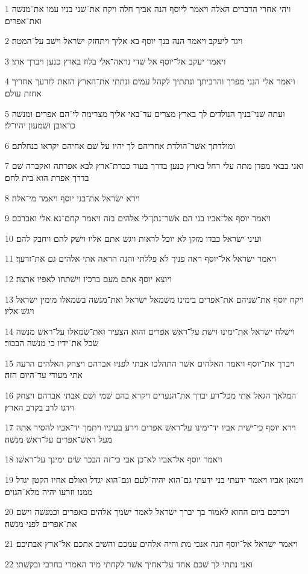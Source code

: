 \par 1 ויהי אחרי הדברים האלה ויאמר ליוסף הנה אביך חלה ויקח את־שׁני בניו עמו את־מנשׁה ואת־אפרים׃
\par 2 ויגד ליעקב ויאמר הנה בנך יוסף בא אליך ויתחזק ישׂראל וישׁב על־המטה׃
\par 3 ויאמר יעקב אל־יוסף אל שׁדי נראה־אלי בלוז בארץ כנען ויברך אתי׃
\par 4 ויאמר אלי הנני מפרך והרביתך ונתתיך לקהל עמים ונתתי את־הארץ הזאת לזרעך אחריך אחזת עולם׃
\par 5 ועתה שׁני־בניך הנולדים לך בארץ מצרים עד־באי אליך מצרימה לי־הם אפרים ומנשׁה כראובן ושׁמעון יהיו־לי׃
\par 6 ומולדתך אשׁר־הולדת אחריהם לך יהיו על שׁם אחיהם יקראו בנחלתם׃
\par 7 ואני בבאי מפדן מתה עלי רחל בארץ כנען בדרך בעוד כברת־ארץ לבא אפרתה ואקברה שׁם בדרך אפרת הוא בית לחם׃
\par 8 וירא ישׂראל את־בני יוסף ויאמר מי־אלה׃
\par 9 ויאמר יוסף אל־אביו בני הם אשׁר־נתן־לי אלהים בזה ויאמר קחם־נא אלי ואברכם׃
\par 10 ועיני ישׂראל כבדו מזקן לא יוכל לראות ויגשׁ אתם אליו וישׁק להם ויחבק להם׃
\par 11 ויאמר ישׂראל אל־יוסף ראה פניך לא פללתי והנה הראה אתי אלהים גם את־זרעך׃
\par 12 ויוצא יוסף אתם מעם ברכיו וישׁתחו לאפיו ארצה׃
\par 13 ויקח יוסף את־שׁניהם את־אפרים בימינו משׂמאל ישׂראל ואת־מנשׁה בשׂמאלו מימין ישׂראל ויגשׁ אליו׃
\par 14 וישׁלח ישׂראל את־ימינו וישׁת על־ראשׁ אפרים והוא הצעיר ואת־שׂמאלו על־ראשׁ מנשׁה שׂכל את־ידיו כי מנשׁה הבכור׃
\par 15 ויברך את־יוסף ויאמר האלהים אשׁר התהלכו אבתי לפניו אברהם ויצחק האלהים הרעה אתי מעודי עד־היום הזה׃
\par 16 המלאך הגאל אתי מכל־רע יברך את־הנערים ויקרא בהם שׁמי ושׁם אבתי אברהם ויצחק וידגו לרב בקרב הארץ׃
\par 17 וירא יוסף כי־ישׁית אביו יד־ימינו על־ראשׁ אפרים וירע בעיניו ויתמך יד־אביו להסיר אתה מעל ראשׁ־אפרים על־ראשׁ מנשׁה׃
\par 18 ויאמר יוסף אל־אביו לא־כן אבי כי־זה הבכר שׂים ימינך על־ראשׁו׃
\par 19 וימאן אביו ויאמר ידעתי בני ידעתי גם־הוא יהיה־לעם וגם־הוא יגדל ואולם אחיו הקטן יגדל ממנו וזרעו יהיה מלא־הגוים׃
\par 20 ויברכם ביום ההוא לאמור בך יברך ישׂראל לאמר ישׂמך אלהים כאפרים וכמנשׁה וישׂם את־אפרים לפני מנשׁה׃
\par 21 ויאמר ישׂראל אל־יוסף הנה אנכי מת והיה אלהים עמכם והשׁיב אתכם אל־ארץ אבתיכם׃
\par 22 ואני נתתי לך שׁכם אחד על־אחיך אשׁר לקחתי מיד האמרי בחרבי ובקשׁתי׃

